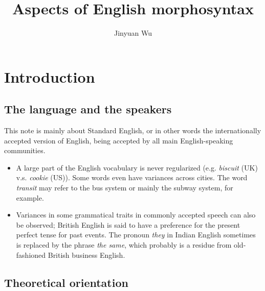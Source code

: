 \documentclass[UTF8, a4paper, oneside, scheme=plain, 12pt]{ctexbook}
\title{Aspects of English morphosyntax}
\author{Jinyuan Wu}
\newcommand{\form}[1]{\emph{#1}}
\begin{document}
    
\maketitle

\automath

\tableofcontents

\chapter{Introduction}

\section{The language and the speakers}

This note is mainly about Standard English,
or in other words the internationally accepted version of English,
being accepted by all main English-speaking communities.

\begin{itemize}
    \item A large part of the English vocabulary is never regularized
    (e.g. \form{biscuit} (UK) v.s. \form{cookie} (US)).
    Some words even have variances across cities.
    The word \form{transit} may refer to the bus system 
    or mainly the subway system, for example.
    \item Variances in some grammatical traits in commonly accepted speech can also be observed;
    British English is said to have a preference for 
    the present perfect tense for past events.
    The pronoun \form{they} in Indian English sometimes is replaced by the phrase \form{the same},
    which probably is a residue from old-fashioned British business English.
\end{itemize}


\section{Theoretical orientation}
\end{document}
